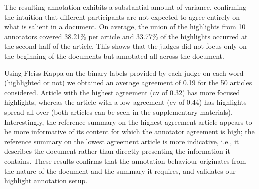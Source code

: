 \documentclass[11pt,a4paper]{article}
\newcommand\xsum{\textsc{XSum}}
\begin{document}


The resulting annotation exhibits a substantial amount of variance, confirming the intuition that different participants are not expected to agree entirely on what is salient in a document. 
On average, the union of the highlights from 10 annotators covered 38.21\% per article and  33.77\% of the highlights occurred at the second half of the article. This shows that the judges did not focus only on the beginning of the documents but annotated all across the document.


Using Fleiss Kappa \citep{Josep1971} on the binary labels provided by each judge on each word (highlighted or not) we obtained an average agreement of 0.19 for the 50 articles considered. Article with the highest agreement (cv of 0.32) has more focused highlights, whereas the article with a low agreement (cv of 0.44) has highlights spread all over (both articles can be seen in the supplementary materials). Interestingly, the reference summary on the highest agreement article appears to be more informative of its content for which the annotator agreement is high; the reference summary on the lowest agreement article is more indicative, i.e., it describes the document rather than directly presenting the information it contains. These results confirms that the annotation behaviour originates from the nature of the document and the summary it requires, and validates our highlight annotation setup.
\end{document}
